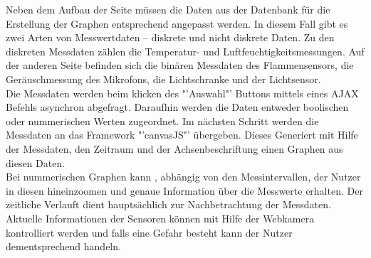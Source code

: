Neben dem Aufbau der Seite müssen die Daten aus der Datenbank für die Erstellung der Graphen entsprechend angepasst werden. In diesem Fall gibt es zwei Arten von Messwertdaten  – diskrete und nicht diskrete Daten. Zu den diskreten Messdaten zählen die Temperatur- und Luftfeuchtigkeitsmessungen. Auf der anderen Seite befinden sich die binären Messdaten des Flammensensors, die Geräuschmessung des Mikrofons, die Lichtschranke und der Lichtsensor.\\
Die Messdaten werden beim klicken des "'Auswahl"' Buttons mittels eines \ac{AJAX} Befehls asynchron abgefragt. Daraufhin werden die Daten entweder boolischen oder nummerischen Werten zugeordnet. Im nächsten Schritt werden die Messdaten an das Framework "'canvasJS"' übergeben. Dieses Generiert mit Hilfe der Messdaten, den Zeitraum und der Achsenbeschriftung einen Graphen aus diesen Daten.\\
Bei nummerischen Graphen kann , abhängig von den Messintervallen, der Nutzer in diesen hineinzoomen und genaue Information über die Messwerte erhalten. Der zeitliche Verlauft dient hauptsächlich zur Nachbetrachtung der Messdaten.\\
Aktuelle Informationen der Sensoren können mit Hilfe der Webkamera kontrolliert werden und falls eine Gefahr besteht kann der Nutzer dementsprechend handeln.
